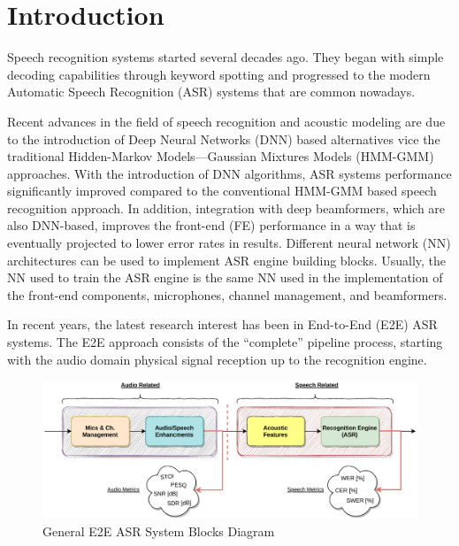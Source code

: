\chapter{Introduction}
Speech recognition systems
started several decades ago.
They began with simple decoding capabilities through keyword
spotting and progressed to the modern Automatic Speech Recognition (ASR) systems
that are common nowadays\cite{asrBriefHistory}.

Recent advances in the field of speech recognition 
and acoustic modeling are
due to the introduction of 
Deep Neural Networks (DNN) 
based alternatives vice the traditional
Hidden-Markov Models---Gaussian Mixtures Models (HMM-GMM) 
approaches\cite{7472778, 6296526}.
With the introduction of DNN algorithms,
ASR systems performance significantly improved
compared to the conventional HMM-GMM 
based speech recognition approach\cite{7472778, 6296526}.
In addition, integration with deep beamformers,
which are also DNN-based, improves
the front-end (FE) performance in a way that is
eventually projected to lower error rates in results.
Different neural network (NN) 
architectures can be used to
implement ASR engine building blocks.
Usually, the NN used to train the ASR engine 
is the same NN used
in the implementation of the
front-end components, microphones, channel management,
and beamformers.

In recent years, the latest research 
interest has been in 
End-to-End (E2E) ASR systems\cite{boeddeker2018exploring}.
The E2E approach consists of the ``complete'' pipeline process, starting with
the audio domain physical signal reception up to the recognition engine.

\begin{figure}[H]
	\centering
	\includegraphics[width=\linewidth]{Introduction/images/asr_blocks}
	\caption{General E2E ASR System Blocks Diagram}\label{fig:asr_blocks_diagram}
\end{figure}
\vspace{-0.5cm}

